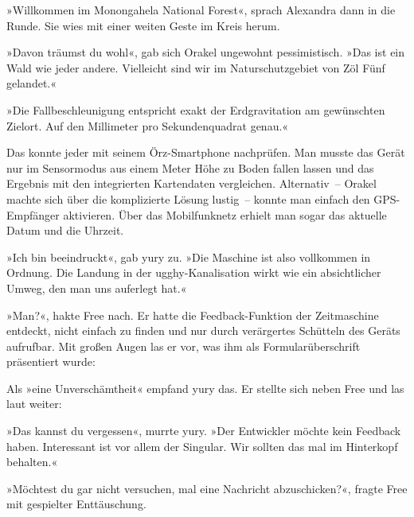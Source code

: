 »Willkommen im Monongahela National Forest«, sprach Alexandra dann in die Runde. Sie wies mit einer weiten Geste im Kreis herum.

»Davon träumst du wohl«, gab sich Orakel ungewohnt pessimistisch. »Das ist ein Wald wie jeder andere. Vielleicht sind wir im Naturschutzgebiet von Zöl Fünf gelandet.«

»Die Fallbeschleunigung entspricht exakt der Erdgravitation am gewünschten Zielort. Auf den Millimeter pro Sekundenquadrat genau.«

Das konnte jeder mit seinem Örz-Smartphone nachprüfen. Man musste das Gerät nur im Sensormodus aus einem Meter Höhe zu Boden fallen lassen und das Ergebnis mit den integrierten Kartendaten vergleichen. Alternativ~– Orakel machte sich über die komplizierte Lösung lustig~– konnte man einfach den GPS-Empfänger aktivieren. Über das Mobilfunknetz erhielt man sogar das aktuelle Datum und die Uhrzeit.

»Ich bin beeindruckt«, gab yury zu. »Die Maschine ist also vollkommen in Ordnung. Die Landung in der ugghy-Kanalisation wirkt wie ein absichtlicher Umweg, den man uns auferlegt hat.«

»Man?«, hakte Free nach. Er hatte die Feedback-Funktion der Zeitmaschine entdeckt, nicht einfach zu finden und nur durch verärgertes Schütteln des Geräts aufrufbar. Mit großen Augen las er vor, was ihm als Formularüberschrift präsentiert wurde:


Als »eine Unverschämtheit« empfand yury das. Er stellte sich neben Free und las laut weiter: 

»Das kannst du vergessen«, murrte yury. »Der Entwickler möchte kein Feedback haben. Interessant ist vor allem der Singular. Wir sollten das mal im Hinterkopf behalten.«

»Möchtest du gar nicht versuchen, mal eine Nachricht abzuschicken?«, fragte Free mit gespielter Enttäuschung.

